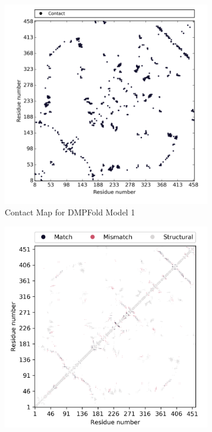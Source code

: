 \begin{figure}[htb]
    \centering %
\begin{subfigure}{0.25\textwidth}
  \includegraphics[width=\linewidth]{Modelling of Atg9/dmp_m1_cmap.png}
  \caption{Contact Map for DMPFold Model 1}
  \label{fig:0}
\end{subfigure}\hfil %
\begin{subfigure}{0.25\textwidth}
  \includegraphics[width=\linewidth]{Modelling of Atg9/dmp_m1_super.png}

\end{subfigure}
\end{figure}
